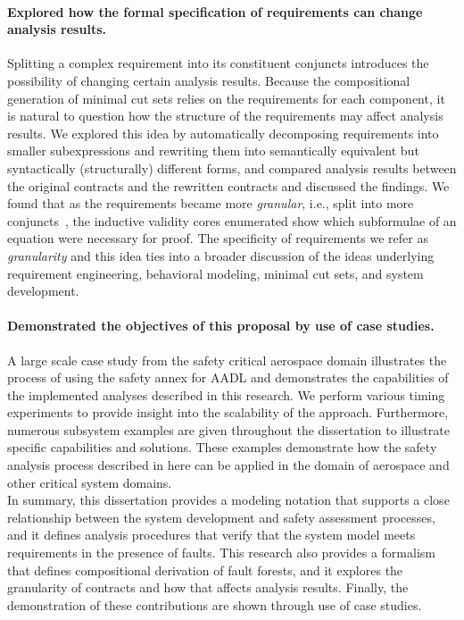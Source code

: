 \paragraph{Explored how the formal specification of requirements can change analysis results.}
Splitting a complex requirement into its constituent conjuncts introduces the possibility of changing certain analysis results. Because the compositional generation of minimal cut sets relies on the requirements for each component, it is natural to question how the structure of the requirements may affect analysis results. We explored this idea by automatically decomposing requirements into smaller subexpressions and rewriting them into semantically equivalent but syntactically (structurally) different forms, and compared analysis results between the original contracts and the rewritten contracts and discussed the findings. We found that as the requirements became more \emph{granular}, i.e., split into more conjuncts~\cite{ghassabani_2018}, the inductive validity cores enumerated show which subformulae of an equation were necessary for proof. The specificity of requirements we refer as \emph{granularity} and this idea ties into a broader discussion of the ideas underlying requirement engineering, behavioral modeling, minimal cut sets, and system development. 

\paragraph{Demonstrated the objectives of this proposal by use of case studies.}
A large scale case study from the safety critical aerospace domain illustrates the process of using the safety annex for AADL and demonstrates the capabilities of the implemented analyses described in this research. We perform various timing experiments to provide insight into the scalability of the approach. Furthermore, numerous subsystem examples are given throughout the dissertation to illustrate specific capabilities and solutions. These examples demonstrate how the safety analysis process described in here can be applied in the domain of aerospace and other critical system domains. \\

In summary, this dissertation provides a modeling notation that supports a close relationship between the system development and safety assessment processes, and it defines analysis procedures that verify that the system model meets requirements in the presence of faults. This research also provides a formalism that defines compositional derivation of fault forests, and it explores the granularity of contracts and how that affects analysis results. Finally, the demonstration of these contributions are shown through use of case studies. 

